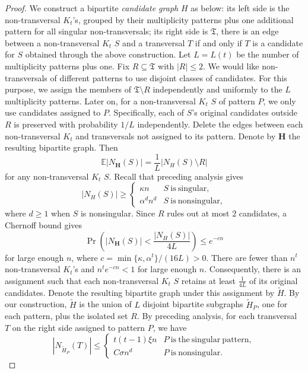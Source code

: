 \documentclass[10pt,a4paper]{amsart}
\begin{document}
\begin{proof}
We construct a bipartite \emph{candidate graph} \(H\) as below: its left side is the non-transversal \(K_t\)'s,
grouped by their multiplicity patterns plus one additional pattern for all singular non-transversals;
its right side is \(\mathfrak T\), there is an edge between a non-transversal \(K_t\) \(S\) and a transversal \(T\)
if and only if \(T\) is a candidate for \(S\) obtained through the above construction.
Let \(L=L(t)\) be the number of multiplicity patterns plus one.
Fix \(R\subseteq\mathfrak T\) with \(|R|\le2\). We would like non-transversals of different patterns to use
disjoint classes of candidates. For this purpose, we assign the members of \(\mathfrak T\setminus R\) independently
and uniformly to the \(L\) multiplicity patterns. Later on, for a non-transversal \(K_t\) \(S\) of pattern \(P\),
we only use candidates assigned to \(P\). Specifically, each of \(S\)'s original candidates outside \(R\) is preserved
with probability \(1/L\) independently. Delete the edges between each non-transversal \(K_t\) and
transversals not assigned to its pattern. Denote by \(\mathbf H\) the resulting bipartite graph. Then
\begin{equation*}
\mathbb E|N_{\mathbf H}(S)|=\frac{1}{L}\left|N_{H}(S)\setminus R\right|
\end{equation*}
for any non-transversal \(K_t\) \(S\). Recall that preceding analysis gives
\begin{equation*}
  |N_H(S)|\ge
  \begin{cases}
    \kappa n & S  \mathrm{\ is\ singular},\\
    \alpha^dn^d & S \mathrm{\ is\ nonsingular},
  \end{cases}
\end{equation*}
where \(d\ge1\) when \(S\) is nonsingular. Since \(R\) rules out at most \(2\) candidates, a Chernoff bound gives
\begin{equation*}
  \Pr\left(|N_{\mathbf{H}}(S)|<\frac{|N_H(S)|}{4L}\right)\le e^{-cn}
\end{equation*}
for large enough \(n\), where \(c=\min\{\kappa,\alpha^t\}/(16L)>0\). There are fewer than \(n^t\) non-transversal
\(K_t\)'s and \(n^te^{-cn}<1\) for large enough \(n\). Consequently, there is an assignment such that each
non-transversal \(K_t\) \(S\) retains at least \(\frac{1}{4L}\) of its original candidates.
Denote the resulting bipartite graph under this assignment by \(\widetilde{H}\). By our construction,
\(\widetilde{H}\) is the union of \(L\) disjoint bipartite subgraphs \(\widetilde{H}_P\), one for each pattern,
plus the isolated set \(R\). By preceding analysis, for each transversal \(T\) on the right side assigned to pattern \(P\), we have
\begin{equation*}
  |N_{\widetilde{H}_P}(T)|\le
  \begin{cases}
    t(t-1)\xi n & P  \mathrm{\ is\ the\ singular\ pattern},\\
    C\sigma n^d & P \mathrm{\ is\ nonsingular}.
  \end{cases}
\end{equation*}


\end{proof}
\end{document}
